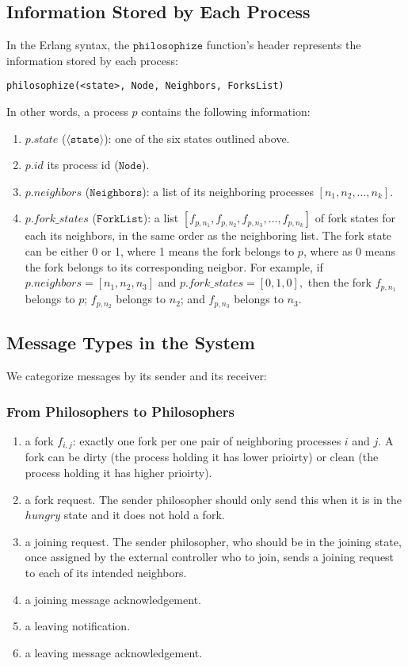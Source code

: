 \documentclass[11pt]{article}
\begin{document}
\subsection{Information Stored by Each Process}
In the Erlang syntax, the $\texttt{philosophize}$ function's header represents
the information stored by each process:
\begin{lstlisting}
philosophize(<state>, Node, Neighbors, ForksList)
\end{lstlisting}
In other words, a process $p$ contains the following information:
\begin{enumerate}
\item $p.state$ ($\langle\texttt{state}\rangle$): one of the six states outlined above.
\item $p.id$ its process id ($\texttt{Node}$).
\item $p.neighbors$ ($\texttt{Neighbors}$): a list of its neighboring processes $[n_1, n_2, \ldots, n_k]$.
\item $p.fork\_states$ ($\texttt{ForkList}$): a list $[f_{p, n_1}, f_{p, n_2}, f_{p, n_3}, \ldots, f_{p, n_k}]$ of fork states for each its neighbors, in the same order as the neighboring list. The fork state can be either 0 or 1, where 1 means the fork belongs to $p$, where as 0 means the fork belongs to its corresponding neigbor. For example, if $p.neighbors = [n_1, n_2, n_3]$ and $p.fork\_states = [0, 1, 0],$ then the fork $f_{p, n_1}$ belongs to $p$; $f_{p, n_2}$ belongs to $n_2$;
and $f_{p, n_3}$ belongs to $n_3$.
\end{enumerate}

\subsection{Message Types in the System}
We categorize messages by its sender and its receiver:
\subsubsection{From Philosophers to Philosophers}
\begin{enumerate}
\item a fork $f_{i,j}$: exactly one fork per one pair of neighboring processes $i$ and $j$. A fork can be dirty (the process holding it has lower prioirty) or clean (the process holding it has higher prioirty).
\item a fork request. The sender philosopher should only send this when it is in the $hungry$ state and it does not hold a fork.
\item a joining request. The sender philosopher, who should be in the joining state, once assigned by the external controller who to join, sends a joining request to each of its intended neighbors.
\item a joining message acknowledgement.
\item a leaving notification.
\item a leaving message acknowledgement.
\end{enumerate}
\end{document}
